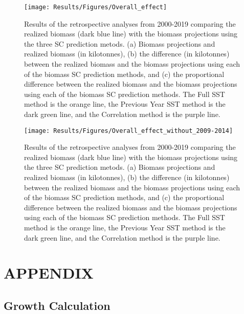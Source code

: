 \documentclass[
]{article}
\begin{document}
\clearpage
\begin{figure}[htb]

{\centering \texttt{[image: Results/Figures/Overall\_effect]} 

}

\caption{Results of the retrospective analyses from 2000-2019 comparing the realized biomass (dark blue line) with the biomass projections using the three SC prediction metods. (a) Biomass projections and realized biomass (in kilotonnes), (b) the difference (in kilotonnes) between the realized biomass and the biomass projections using each of the biomass SC prediction methods, and (c) the proportional difference between the realized biomass and the biomass projections using each of the biomass SC prediction methods.  The Full SST method is the orange line, the Previous Year SST method is the dark green line, and the Correlation method is the purple line.}\label{fig:bm-effect-plt}
\end{figure}

\clearpage
\begin{figure}[htb]

{\centering \texttt{[image: Results/Figures/Overall\_effect\_without\_2009-2014]} 

}

\caption{Results of the retrospective analyses from 2000-2019 comparing the realized biomass (dark blue line) with the biomass projections using the three SC prediction metods. (a) Biomass projections and realized biomass (in kilotonnes), (b) the difference (in kilotonnes) between the realized biomass and the biomass projections using each of the biomass SC prediction methods, and (c) the proportional difference between the realized biomass and the biomass projections using each of the biomass SC prediction methods.  The Full SST method is the orange line, the Previous Year SST method is the dark green line, and the Correlation method is the purple line.}\label{fig:bm-effect-drop09-14-plt}
\end{figure}

\clearpage

\newpage

\hypertarget{ref-app}{%
\section{APPENDIX}\label{ref-app}}

\hypertarget{growth-calculation}{%
\subsection{Growth Calculation}\label{growth-calculation}}
\end{document}

